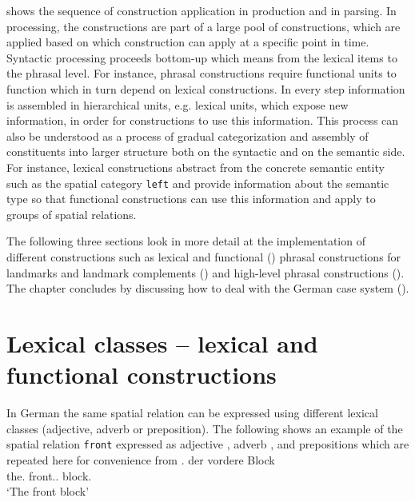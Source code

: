  shows the sequence of 
construction application in production and in parsing. 
In processing, the constructions are part of a 
large pool of constructions, which are applied based on which 
construction can apply at a specific point in time.
Syntactic processing proceeds bottom-up which means from the lexical 
items to the phrasal level. For instance, phrasal constructions require functional 
units to function which in turn depend on lexical constructions. In every
step information is assembled in hierarchical units, e.g. lexical units,
which expose new information, in order for constructions to use this information.
This process can also be understood as a process of gradual categorization
and assembly of constituents into larger structure both on 
the syntactic and on the semantic side. For instance, lexical constructions
abstract from the concrete semantic entity such as the spatial category 
{\footnotesize\tt left} and provide information about
the semantic type so that functional constructions can use this information
and apply to groups of spatial relations.

The following three sections look in more detail at the implementation
of different constructions such as lexical and functional 
() phrasal constructions for landmarks
and landmark complements ()
and high-level phrasal constructions ().
The chapter concludes by discussing how to deal with the German
case system ().


\section{Lexical classes -- lexical and functional constructions}
\label{s:lexical-functional}
In German the same spatial relation can be expressed using different lexical classes
(adjective, adverb or preposition). The following shows 
an example of the spatial relation {\footnotesize\tt front} expressed
as adjective , adverb , 
and prepositions  which
are repeated here for convenience from .
\ea
\label{e:der-vordere-block-2}
\gll der vordere Block\\
the.{\NOM} front.{\ADJ}.{\NOM} block.{\NOM}\\
\glt `The front block'\\

